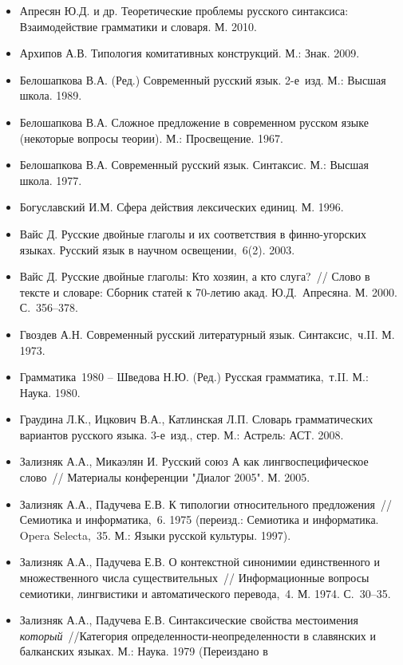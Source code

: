 \begin{itemize}
\item
  Апресян Ю.Д. и др. Теоретические проблемы русского синтаксиса:
  Взаимодействие грамматики и словаря. М. 2010.
\item
  Архипов А.В. Типология комитативных конструкций. М.: Знак. 2009.
\item
  Белошапкова В.А. (Ред.) Современный русский язык. 2-е~изд. М.: Высшая
  школа. 1989.
\item
  Белошапкова В.А. Сложное предложение в современном русском языке
  (некоторые вопросы теории). М.: Просвещение. 1967.
\item
  Белошапкова В.А. Современный русский язык. Синтаксис. М.: Высшая
  школа. 1977.
\item
  Богуславский И.М. Сфера действия лексических единиц. М. 1996.
\item
  Вайс Д. Русские двойные глаголы и их соответствия в финно-угорских
  языках. Русский язык в научном освещении,~6(2). 2003.
\item
  Вайс Д. Русские двойные глаголы: Кто хозяин, а кто слуга?~// Слово в
  тексте и словаре: Сборник статей к 70-летию акад. Ю.Д.~Апресяна. М.
  2000. С.~356--378.
\item
  Гвоздев А.Н. Современный русский литературный язык. Синтаксис,~ч.II.
  М. 1973.
\item
  Грамматика~1980 -- Шведова Н.Ю. (Ред.) Русская грамматика,~т.II. М.:
  Наука. 1980.
\item
  Граудина Л.К., Ицкович В.А., Катлинская Л.П. Словарь грамматических
  вариантов русского языка. 3-е~изд., стер. М.: Астрель: АСТ. 2008.
\item
  Зализняк А.А., Микаэлян И. Русский союз А как лингвоспецифическое
  слово~// Материалы конференции "Диалог 2005". М. 2005.
\item
  Зализняк А.А., Падучева Е.В. К типологии относительного предложения~//
  Семиотика и информатика,~6. 1975 (переизд.: Семиотика и информатика.
  Opera Selecta,~35. М.: Языки русской культуры. 1997).
\item
  Зализняк А.А., Падучева Е.В. О контекстной синонимии единственного и
  множественного числа существительных~// Информационные вопросы
  семиотики, лингвистики и автоматического перевода,~4. М. 1974.
  С.~30--35.
\item
  Зализняк А.А., Падучева Е.В. Синтаксические свойства местоимения
  \emph{который}~//Категория определенности-неопределенности в
  славянских и балканских языках. М.: Наука. 1979 (Переиздано в

\end{itemize}
